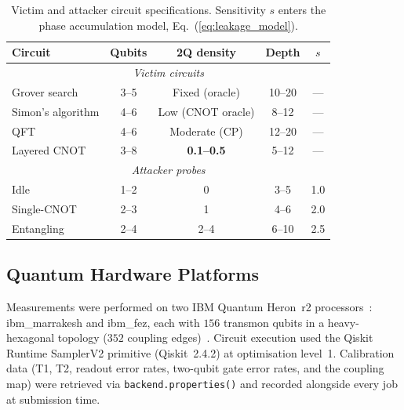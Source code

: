 \documentclass[ASNA,twocolumn]{USG}
\begin{document}
\begin{table}[t]
\centering
\caption{Victim and attacker circuit specifications. Sensitivity $s$ enters the phase accumulation model, Eq.~(\ref{eq:leakage_model}).}
\label{tab:circuits}
\begin{tabular}{lcccc}
\toprule
Circuit & Qubits & 2Q density & Depth & $s$ \\
\midrule
\multicolumn{5}{c}{\textit{Victim circuits}} \\
Grover search     & 3--5  & Fixed (oracle)   & 10--20 & --- \\
Simon's algorithm & 4--6  & Low (CNOT oracle)& 8--12  & --- \\
QFT               & 4--6  & Moderate (CP)    & 12--20 & --- \\
Layered CNOT      & 3--8  & \textbf{0.1--0.5}& 5--12  & --- \\
\midrule
\multicolumn{5}{c}{\textit{Attacker probes}} \\
Idle              & 1--2  & 0        & 3--5  & 1.0 \\
Single-CNOT       & 2--3  & 1        & 4--6  & 2.0 \\
Entangling        & 2--4  & 2--4     & 6--10 & 2.5 \\
\bottomrule
\end{tabular}
\end{table}

\subsection{Quantum Hardware Platforms}

Measurements were performed on two IBM Quantum Heron~r2 processors~\cite{ibmq2026}: ibm\_marrakesh and ibm\_fez, each with $156$ transmon qubits in a heavy-hexagonal topology ($352$ coupling edges)~\cite{gambetta2017building}. Circuit execution used the Qiskit Runtime SamplerV2 primitive (Qiskit~2.4.2) at optimisation level~1. Calibration data (T1, T2, readout error rates, two-qubit gate error rates, and the coupling map) were retrieved via \texttt{backend.properties()} and recorded alongside every job at submission time.
\end{document}
